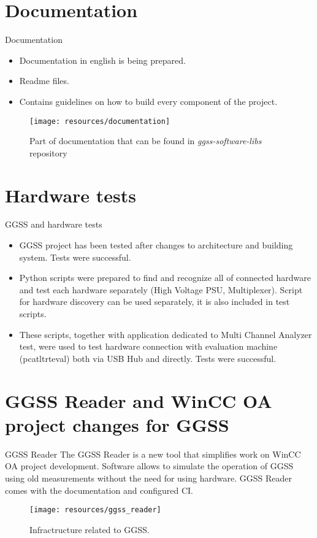 \documentclass[10pt]{beamer}
\begin{document}
\section {Documentation}

\begin{frame}{Documentation}
\begin{itemize}
  \item Documentation in english is being prepared.
  \item Readme files.
  \item Contains guidelines on how to build every component of the project.
\end{itemize}
\begin{figure}
    \centering
    \texttt{[image: resources/documentation]}
    \caption{Part of documentation that can be found in \textit{ggss-software-libs} repository}
\end{figure}
\end{frame}

\section {Hardware tests}

\begin{frame}{GGSS and hardware tests}
\begin{itemize}
	\item GGSS project has been tested after changes to architecture and building system. Tests were \color{darkgreen}successful\color{black}.
	\item Python scripts were prepared to find and recognize all of connected hardware and test each hardware separately (High Voltage PSU, Multiplexer). Script for hardware discovery can be used separately, it is also included in test scripts.
	\item These scripts, together with application dedicated to Multi Channel Analyzer test, were used to test hardware connection with evaluation machine (pcatltrteval) both via USB Hub and directly. Tests were \color{darkgreen}successful\color{black}.
\end{itemize}
\end{frame}

\section {GGSS Reader and WinCC OA project changes for GGSS}

\begin{frame}{GGSS Reader}
The GGSS Reader is a new tool that simplifies work on WinCC OA project development.
Software allows to simulate the operation of GGSS using old measurements without the need for using hardware.
GGSS Reader comes with the documentation and configured CI.
\begin{figure}
    \centering
    \texttt{[image: resources/ggss\_reader]}
    \caption{Infractructure related to GGSS.}
\end{figure}
\end{frame}
\end{document}
